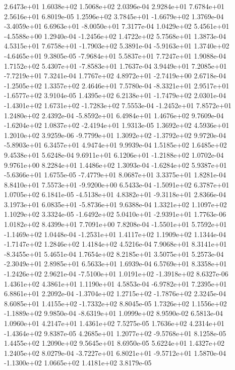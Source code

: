2.6473e+01 1.6038e+02 1.5068e+02  2.0396e-04
2.9284e+01 7.6784e+01 2.5616e+01  6.8019e-05
 1.2596e+02  3.7845e+01 -1.6679e+02  1.3769e-04
-3.4059e+01  6.6963e+01 -8.0050e+01  7.3177e-04
 1.0429e+02  5.4561e+01 -4.5588e+00  1.2940e-04
-1.2456e+02  1.4722e+02  5.7568e+01  1.3873e-04
 4.5315e+01  7.6758e+01 -1.7903e+02  5.3891e-04
-5.9163e+01  1.3740e+02 -4.6465e+01  9.3805e-05
-7.9684e+01  5.5837e+01  7.7247e+01  1.9088e-04
 1.7152e+02  5.4307e+01 -7.8583e+01  1.7637e-04
 3.9449e+01  7.2085e+01 -7.7219e+01  7.3241e-04
 1.7767e+02  4.8972e+01 -2.7419e+00  2.6718e-04
-1.2505e+02  1.3357e+02  2.4646e+01  7.5780e-04
-8.3321e+01  2.9517e+01 -1.6577e+02  3.9104e-05
 1.4395e+02  6.2138e+01 -1.7479e+02  2.0301e-04
-1.4301e+02  1.6731e+02 -1.7283e+02  7.5553e-04
-1.2452e+01  7.8572e+01  1.2480e+02  2.4392e-04
-5.8592e+01  6.4984e+01  1.4676e+02  9.7609e-04
-1.6204e+02  1.0837e+02 -2.4194e+01  1.9313e-05
1.3692e+02 4.5936e+01 1.2010e+02  3.9259e-06
-9.7799e+01  1.3092e+02 -1.3792e+02  9.9720e-04
-5.8903e+01  6.3457e+01  4.9474e+01  9.9939e-04
1.5185e+02 1.6485e+02 9.4538e+01  5.6248e-04
 9.6911e+01  6.1206e+01 -1.2188e+02  1.0702e-04
9.9761e+00 8.2284e+01 1.4486e+02  1.3093e-04
-1.6284e+02  5.9387e+01 -5.6366e+01  1.6755e-05
-7.4779e+01  8.0687e+01  3.3375e+01  1.8281e-04
 8.8410e+01  7.5573e+01 -9.9200e+00  6.5433e-04
-1.5091e+02  6.3787e+01  1.0705e+02  6.1841e-05
-4.5138e+01  4.8382e+01 -9.3118e+01  2.8366e-04
 3.1973e+01  6.0835e+01 -5.8736e+01  9.6388e-04
1.3321e+02 1.1097e+02 1.1029e+02  3.3324e-05
-1.6492e+02  5.0410e+01 -2.9391e+01  1.7763e-06
1.0182e+02 8.4399e+01 7.7091e+00  7.8208e-04
-1.5501e+01  5.7592e+01 -1.1469e+02  1.0448e-04
-1.2531e+01  1.4117e+02  1.1909e+02  1.1344e-04
-1.7147e+02  1.2846e+02  1.4184e+02  4.5216e-04
 7.9068e+01  8.3141e+01 -8.3455e+01  5.4651e-04
1.7654e+02 8.2185e+01 3.5075e+01  5.2573e-04
-2.3049e+01  2.8985e+01  6.5633e+01  1.6939e-04
 6.5769e+01  8.3358e+01 -1.2426e+02  2.9621e-04
-7.5100e+01  1.0191e+02 -1.3918e+02  8.6327e-06
1.4361e+02 4.3861e+01 1.1190e+01  4.5853e-04
-6.9782e+01  7.2395e+01  6.8861e+01  2.2092e-04
-1.3704e+02  1.2715e+02 -1.7876e+02  2.3245e-04
 8.6085e+01  1.4155e+02 -1.7332e+02  8.8045e-05
 1.7326e+02  1.1556e+02 -1.1889e+02  9.9850e-04
-8.6319e+01  1.0999e+02  8.9590e-02  6.5813e-04
1.0960e+01 4.2147e+01 1.4361e+02  7.5275e-05
 1.7636e+02  4.2314e+01 -1.4364e+02  9.8387e-05
 4.2685e+01  1.2077e+02 -9.5768e+01  8.1258e-05
1.4455e+02 1.2090e+02 9.5645e+01  8.6950e-05
5.6224e+01 1.4327e+02 1.2405e+02  8.0279e-04
-3.7227e+01  6.8021e+01 -9.5712e+01  1.5870e-04
-1.1300e+02  1.0665e+02  1.4181e+02  3.8179e-05
